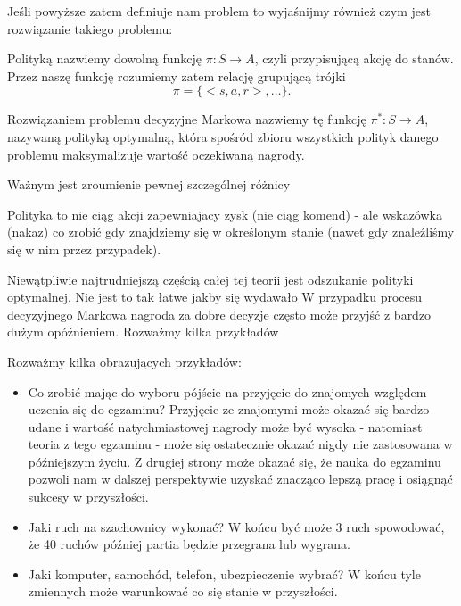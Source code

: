 \documentclass[10pt,a4paper]{book}
\begin{document}
Jeśli powyższe zatem definiuje nam problem to wyjaśnijmy również czym jest rozwiązanie takiego problemu:

\begin{definition}[Polityka]
Polityką nazwiemy dowolną funkcję $\pi: S \to A$, czyli przypisującą akcję do stanów. Przez naszę funkcję rozumiemy zatem relację grupującą trójki 
$$
\pi = \{ <s,a,r>, \ldots \}.
$$
\end{definition}

\begin{definition}
Rozwiązaniem problemu decyzyjne Markowa nazwiemy tę funkcję $\pi^\ast: S \to A$, nazywaną polityką optymalną, która spośród zbioru wszystkich polityk danego problemu maksymalizuje wartość oczekiwaną nagrody.
\end{definition}

Ważnym jest zroumienie pewnej szczególnej różnicy

\begin{remark*}
Polityka to nie ciąg akcji zapewniajacy zysk (nie ciąg komend) - ale wskazówka (nakaz) co zrobić gdy znajdziemy się w określonym stanie (nawet gdy znaleźliśmy się w nim przez przypadek).
\end{remark*}

Niewątpliwie najtrudniejszą częścią całej tej teorii jest odszukanie polityki optymalnej. Nie jest to tak łatwe jakby się wydawało  W przypadku procesu decyzyjnego Markowa nagroda za dobre decyzje często może przyjść z bardzo dużym opóźnieniem. Rozważmy kilka przykładów

\begin{example}[Przykłady]

Rozważmy kilka obrazujących przykładów:
\begin{itemize}
\item Co zrobić mając do wyboru pójście na przyjęcie do znajomych względem uczenia się do egzaminu? Przyjęcie ze znajomymi może okazać się bardzo udane i wartość natychmiastowej nagrody może być wysoka - natomiast teoria z tego egzaminu - może się ostatecznie okazać nigdy nie zastosowana w późniejszym życiu. Z drugiej strony może okazać się, że nauka do egzaminu pozwoli nam w dalszej perspektywie uzyskać znacząco lepszą pracę i osiągnąć sukcesy w przyszłości.
\item Jaki ruch na szachownicy wykonać? W końcu być może 3 ruch spowodować, że 40 ruchów później partia będzie przegrana lub wygrana.
\item Jaki komputer, samochód, telefon, ubezpieczenie wybrać? W końcu tyle zmiennych może warunkować co się stanie w przyszłości.
\end{itemize}

\end{example}
\end{document}
